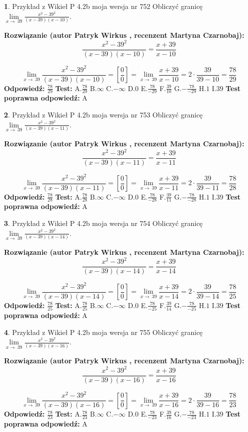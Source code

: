 \documentclass[12pt, a4paper]{article}
\theoremstyle{definition} %
\newtheorem{zad}{}
\newcommand{\zadStart}[1]{\begin{zad}#1\newline}
\newcommand{\zadStop}{\end{zad}}
\newcommand{\rozwStart}[2]{\noindent \textbf{Rozwiązanie (autor #1 , recenzent #2): }\newline}
\newcommand{\rozwStop}{\newline}
\newcommand{\odpStart}{\noindent \textbf{Odpowiedź:}\newline}
\newcommand{\odpStop}{\newline}
\newcommand{\testStart}{\noindent \textbf{Test:}\newline}
\newcommand{\testStop}{\newline}
\newcommand{\kluczStart}{\noindent \textbf{Test poprawna odpowiedź:}\newline}
\newcommand{\kluczStop}{\newline}
\begin{document}
\zadStart{Przykład z Wikieł P 4.2b moja wersja nr 752}
Obliczyć granicę $\lim\limits_{x\to\ 39}\frac{x^{2}-39^{2}}{(x-39)(x-10)}$.
\zadStop
\rozwStart{Patryk Wirkus}{Martyna Czarnobaj}
$$\frac{x^{2}-39^{2}}{(x-39)(x-10)}=\frac{x+39}{x-10}$$

$$\lim\limits_{x\to\ 39}\frac{x^{2}-39^{2}}{(x-39)(x-10)}=[\frac{0}{0}]=\lim\limits_{x\to\ 39}\frac{x+39}{x-10}=2 \cdot \frac{39}{39-10} = \frac{78}{29}$$
\rozwStop
\odpStart
$\frac{78}{29}$
\odpStop
\testStart
A.$\frac{78}{29}$
B.$\infty$
C.$-\infty$
D.$0$
E.$\frac{78}{-29}$
F.$\frac{39}{10}$
G.$-\frac{78}{-29}$
H.$1$
I.$39$
\testStop
\kluczStart
A
\kluczStop



\zadStart{Przykład z Wikieł P 4.2b moja wersja nr 753}
Obliczyć granicę $\lim\limits_{x\to\ 39}\frac{x^{2}-39^{2}}{(x-39)(x-11)}$.
\zadStop
\rozwStart{Patryk Wirkus}{Martyna Czarnobaj}
$$\frac{x^{2}-39^{2}}{(x-39)(x-11)}=\frac{x+39}{x-11}$$

$$\lim\limits_{x\to\ 39}\frac{x^{2}-39^{2}}{(x-39)(x-11)}=[\frac{0}{0}]=\lim\limits_{x\to\ 39}\frac{x+39}{x-11}=2 \cdot \frac{39}{39-11} = \frac{78}{28}$$
\rozwStop
\odpStart
$\frac{78}{28}$
\odpStop
\testStart
A.$\frac{78}{28}$
B.$\infty$
C.$-\infty$
D.$0$
E.$\frac{78}{-28}$
F.$\frac{39}{11}$
G.$-\frac{78}{-28}$
H.$1$
I.$39$
\testStop
\kluczStart
A
\kluczStop



\zadStart{Przykład z Wikieł P 4.2b moja wersja nr 754}
Obliczyć granicę $\lim\limits_{x\to\ 39}\frac{x^{2}-39^{2}}{(x-39)(x-14)}$.
\zadStop
\rozwStart{Patryk Wirkus}{Martyna Czarnobaj}
$$\frac{x^{2}-39^{2}}{(x-39)(x-14)}=\frac{x+39}{x-14}$$

$$\lim\limits_{x\to\ 39}\frac{x^{2}-39^{2}}{(x-39)(x-14)}=[\frac{0}{0}]=\lim\limits_{x\to\ 39}\frac{x+39}{x-14}=2 \cdot \frac{39}{39-14} = \frac{78}{25}$$
\rozwStop
\odpStart
$\frac{78}{25}$
\odpStop
\testStart
A.$\frac{78}{25}$
B.$\infty$
C.$-\infty$
D.$0$
E.$\frac{78}{-25}$
F.$\frac{39}{14}$
G.$-\frac{78}{-25}$
H.$1$
I.$39$
\testStop
\kluczStart
A
\kluczStop



\zadStart{Przykład z Wikieł P 4.2b moja wersja nr 755}
Obliczyć granicę $\lim\limits_{x\to\ 39}\frac{x^{2}-39^{2}}{(x-39)(x-16)}$.
\zadStop
\rozwStart{Patryk Wirkus}{Martyna Czarnobaj}
$$\frac{x^{2}-39^{2}}{(x-39)(x-16)}=\frac{x+39}{x-16}$$

$$\lim\limits_{x\to\ 39}\frac{x^{2}-39^{2}}{(x-39)(x-16)}=[\frac{0}{0}]=\lim\limits_{x\to\ 39}\frac{x+39}{x-16}=2 \cdot \frac{39}{39-16} = \frac{78}{23}$$
\rozwStop
\odpStart
$\frac{78}{23}$
\odpStop
\testStart
A.$\frac{78}{23}$
B.$\infty$
C.$-\infty$
D.$0$
E.$\frac{78}{-23}$
F.$\frac{39}{16}$
G.$-\frac{78}{-23}$
H.$1$
I.$39$
\testStop
\kluczStart
A
\kluczStop
\end{document}
